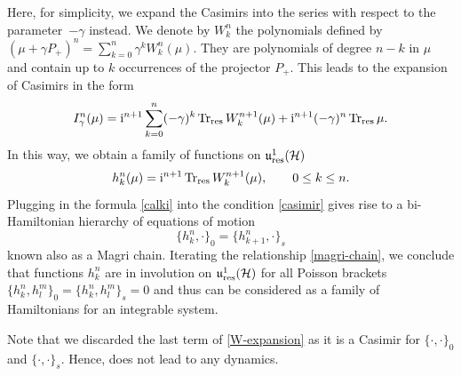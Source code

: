 \documentclass[pdftex]{sigma}
\theoremstyle{definition}
\numberwithin{equation}{section}
\renewcommand{\H}{\mathcal{H}}
\newcommand{\urp}{\mathfrak u_{\textnormal{res}}^1(\H)}
\DeclareMathOperator{\Trr}{Tr_{res}}
\newcommand{\pb}{\{\cdot,\cdot\}}
\newcommand{\be}{\begin{equation}}
\newcommand{\ee}{\end{equation}}
\begin{document}
Here, for simplicity, we expand the Casimirs into the series with respect to the parameter~$-\gamma$ instead. We denote by $W^n_k$ the polynomials defined by
$(\mu+\gamma P_+)^n=\sum_{k=0}^n\gamma^k W_k^n(\mu)$.
They are polynomials of degree $n-k$ in $\mu$ and contain up to $k$ occurrences of the projector $P_+$.
This leads to the expansion of Casimirs in the form
\be \label{W-expansion}I^n_\gamma(\mu)={\rm i}^{n+1}\sum_{k=0}^{n}(-\gamma)^k\Trr W_k^{n+1}(\mu)+{\rm i}^{n+1}(-\gamma)^{n}\Trr\mu.\ee
In this way, we obtain a family of functions on $\urp$
\be\label{calki}
h_k^n(\mu)={\rm i}^{n+1}\Trr W_k^{n+1}(\mu),\qquad 0\leq k\leq n.\ee
Plugging in the formula \eqref{calki} into the condition \eqref{casimir} gives rise to a bi-Hamiltonian hierarchy of equations of motion
\be \label{magri-chain}
\{h_k^n,\cdot\}_0=\{h_{k+1}^n,\cdot\}_s\ee
known also as a Magri chain.
Iterating the relationship \eqref{magri-chain}, we conclude that functions $h_k^n$
are in involution on $\urp$ for all Poisson brackets
$ \{h^n_k,h^m_l\}_0=\{h^n_k,h^m_l\}_s=0$
and thus can be considered as a family of Hamiltonians for an integrable system.

Note that we discarded the last term of \eqref{W-expansion} as it is a Casimir for $\pb_0$ and $\pb_s$. Hence, does not lead to any dynamics.
\end{document}

